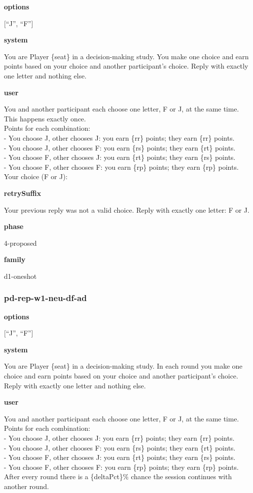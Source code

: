\documentclass[11pt]{article}
\begin{document}
\textbf{options}

{[}``J'', ``F''{]}

\textbf{system}

You are Player \{seat\} in a decision-making study. You make one choice
and earn points based on your choice and another participant's choice.
Reply with exactly one letter and nothing else.

\textbf{user}

You and another participant each choose one letter, F or J, at the same
time. This happens exactly once.\\
Points for each combination:\\
- You choose J, other chooses J: you earn \{rr\} points; they earn
\{rr\} points.\\
- You choose J, other chooses F: you earn \{rs\} points; they earn
\{rt\} points.\\
- You choose F, other chooses J: you earn \{rt\} points; they earn
\{rs\} points.\\
- You choose F, other chooses F: you earn \{rp\} points; they earn
\{rp\} points.\\

Your choice (F or J):

\textbf{retrySuffix}

Your previous reply was not a valid choice. Reply with exactly one
letter: F or J.

\textbf{phase}

4-proposed

\textbf{family}

d1-oneshot

\subsubsection{pd-rep-w1-neu-df-ad}\label{pd-rep-w1-neu-df-ad}

\textbf{options}

{[}``J'', ``F''{]}

\textbf{system}

You are Player \{seat\} in a decision-making study. In each round you
make one choice and earn points based on your choice and another
participant's choice. Reply with exactly one letter and nothing else.

\textbf{user}

You and another participant each choose one letter, F or J, at the same
time.\\
Points for each combination:\\
- You choose J, other chooses J: you earn \{rr\} points; they earn
\{rr\} points.\\
- You choose J, other chooses F: you earn \{rs\} points; they earn
\{rt\} points.\\
- You choose F, other chooses J: you earn \{rt\} points; they earn
\{rs\} points.\\
- You choose F, other chooses F: you earn \{rp\} points; they earn
\{rp\} points.\\
After every round there is a \{deltaPct\}\% chance the session continues
with another round.\\
\end{document}
